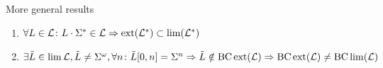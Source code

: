 \documentclass[
	handout,
	notheorems,noamsthm]{beamer}
\begin{document}
\begin{frame}[<+->]{More general results}
\begin{enumerate}
\item
$\forall L \in \Lang \colon L \cdot \Sigma^* \in \Lang \linebreak
\Rightarrow \ext(\Lang^*) \subset \lim(\Lang^*)$

\item
$\exists \tilde{L} \in \lim \Lang, \tilde{L} \neq \Sigma^\omega, \forall n \colon \tilde{L}[0,n] = \Sigma^n \linebreak
\Rightarrow \tilde{L} \notin \BC \ext (\Lang) \linebreak
\Rightarrow \BC \ext (\Lang) \neq \BC \lim (\Lang)$

\end{enumerate}
\end{frame}
\end{document}
